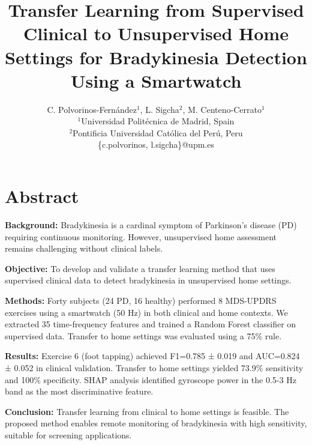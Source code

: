 \documentclass{article}
\begin{document}
\title{\textbf{Transfer Learning from Supervised Clinical to Unsupervised Home Settings for Bradykinesia Detection Using a Smartwatch}}

\author{
    C. Polvorinos-Fernández$^{1}$, L. Sigcha$^{2}$, M. Centeno-Cerrato$^{1}$ \\
    \small
    $^{1}$Universidad Politécnica de Madrid, Spain \\
    $^{2}$Pontificia Universidad Católica del Perú, Peru \\
    \{c.polvorinos, l.sigcha\}@upm.es
}

\maketitle

\section*{Abstract}

\textbf{Background:} Bradykinesia is a cardinal symptom of Parkinson's disease (PD) requiring continuous monitoring. However, unsupervised home assessment remains challenging without clinical labels.

\textbf{Objective:} To develop and validate a transfer learning method that uses supervised clinical data to detect bradykinesia in unsupervised home settings.

\textbf{Methods:} Forty subjects (24 PD, 16 healthy) performed 8 MDS-UPDRS exercises using a smartwatch (50 Hz) in both clinical and home contexts. We extracted 35 time-frequency features and trained a Random Forest classifier on supervised data. Transfer to home settings was evaluated using a 75\% rule.

\textbf{Results:} Exercise 6 (foot tapping) achieved F1=0.785 ± 0.019 and AUC=0.824 ± 0.052 in clinical validation. Transfer to home settings yielded 73.9\% sensitivity and 100\% specificity. SHAP analysis identified gyroscope power in the 0.5-3 Hz band as the most discriminative feature.

\textbf{Conclusion:} Transfer learning from clinical to home settings is feasible. The proposed method enables remote monitoring of bradykinesia with high sensitivity, suitable for screening applications.

\end{document}
